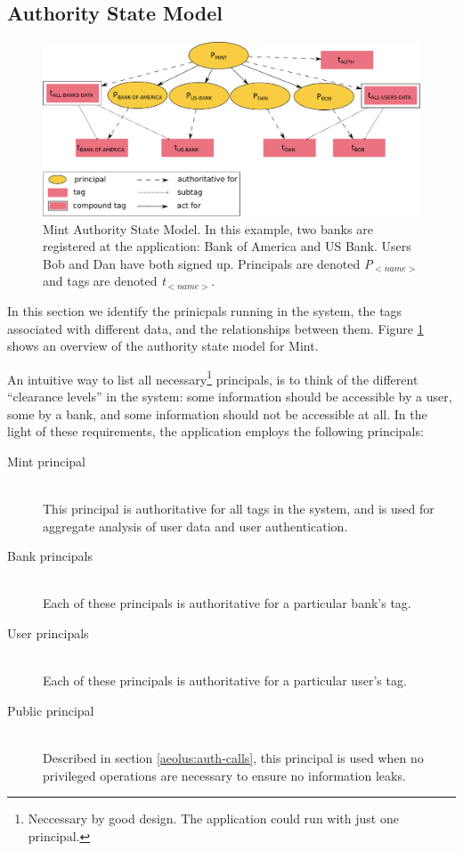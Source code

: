 \subsection{Authority State Model}

\begin{figure}[h]
\centering
\includegraphics[width=\textwidth,height=\textheight,keepaspectratio]{figures/mint-auth-state-model}
\caption{Mint Authority State Model. In this example, two banks are registered at the application: Bank of America and US Bank. Users Bob and Dan have both signed up. Principals are denoted \emph{P$_{<name>}$} and tags are denoted \emph{t$_{<name>}$}.}
\label{fig:mint-auth-state-model}
\end{figure}


In this section we identify the prinicpals running in the system, the tags associated with different data, and the relationships between them. Figure \ref{fig:mint-auth-state-model} shows an overview of the authority state model for Mint.

An intuitive way to list all necessary\footnote{Neccessary by good design. The application could run with just one principal.} principals, is to think of the different ``clearance levels'' in the system: some information should be accessible by a user, some by a bank, and some information should not be accessible at all. In the light of these requirements, the application employs the following principals:
\begin{description}
  \item[Mint principal] \ \\
    This principal is authoritative for all tags in the system, and is
    used for aggregate analysis of user data and
    user authentication.
  \item[Bank principals] \ \\
    Each of these principals is authoritative for a particular bank's tag.
  \item[User principals] \ \\
    Each of these principals is authoritative for a particular user's tag.
  \item[Public principal] \ \\
    Described in section \ref{aeolus:auth-calls}, this
    principal is used when no privileged operations are 
    necessary to ensure no information leaks.
\end{description}

